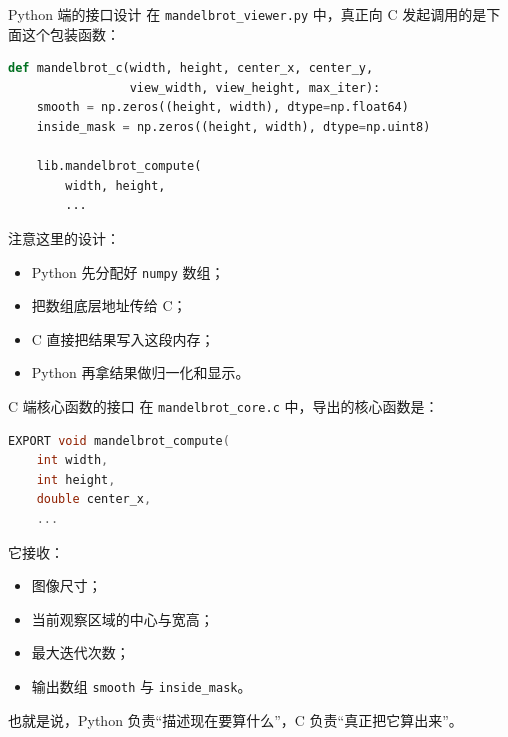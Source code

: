\documentclass[aspectratio=169,11pt]{ctexbeamer}
\begin{document}
\begin{frame}[fragile]{Python 端的接口设计}
在 \texttt{mandelbrot\_viewer.py} 中，真正向 C 发起调用的是下面这个包装函数：

\begin{lstlisting}[language=Python]
def mandelbrot_c(width, height, center_x, center_y,
                 view_width, view_height, max_iter):
    smooth = np.zeros((height, width), dtype=np.float64)
    inside_mask = np.zeros((height, width), dtype=np.uint8)

    lib.mandelbrot_compute(
        width, height,
        ...
\end{lstlisting}

注意这里的设计：

\begin{itemize}
  \item Python 先分配好 \texttt{numpy} 数组；
  \item 把数组底层地址传给 C；
  \item C 直接把结果写入这段内存；
  \item Python 再拿结果做归一化和显示。
\end{itemize}
\end{frame}

\begin{frame}[fragile]{C 端核心函数的接口}
在 \texttt{mandelbrot\_core.c} 中，导出的核心函数是：

\begin{lstlisting}[language=C]
EXPORT void mandelbrot_compute(
    int width,
    int height,
    double center_x,
    ...
\end{lstlisting}

它接收：

\begin{itemize}
  \item 图像尺寸；
  \item 当前观察区域的中心与宽高；
  \item 最大迭代次数；
  \item 输出数组 \texttt{smooth} 与 \texttt{inside\_mask}。
\end{itemize}

也就是说，Python 负责“描述现在要算什么”，C 负责“真正把它算出来”。
\end{frame}
\end{document}
